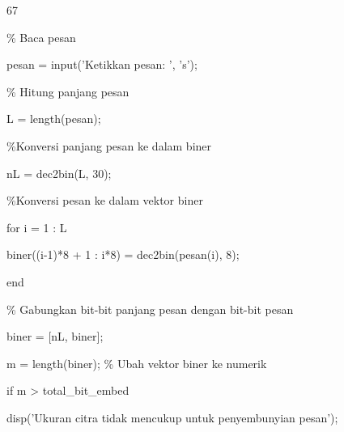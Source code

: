 \documentclass{article}
\begin{document}

67

\% Baca pesan

pesan = input('Ketikkan pesan: ', 's');


\% Hitung panjang pesan

L = length(pesan);


\%Konversi panjang pesan ke dalam biner

nL = dec2bin(L, 30);

\%Konversi pesan ke dalam vektor biner

for i = 1 : L

    biner((i-1)*8 + 1 : i*8) = dec2bin(pesan(i), 8);

end


\% Gabungkan bit-bit panjang pesan dengan bit-bit pesan

biner = [nL, biner];

m = length(biner);       \% Ubah vektor biner ke numerik


if m > total\_bit\_embed 

    disp('Ukuran citra tidak mencukup untuk penyembunyian pesan');
\end{document}
